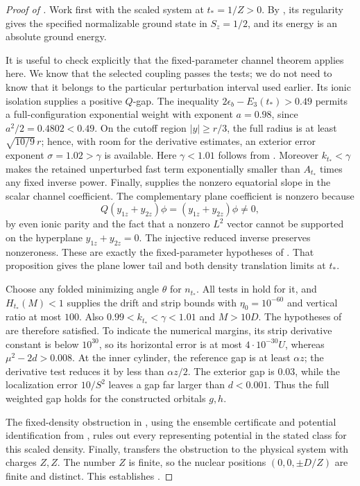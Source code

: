 \begin{proof}[Proof of ]
Work first with the scaled system at \(t_*=1/Z>0\).
By , its regularity gives the
specified normalizable ground state in \(S_z=1/2\), and its
energy is an absolute ground energy.

It is useful to check explicitly that the fixed-parameter channel
theorem applies here.  We know that the selected coupling passes
the tests; we do not need to know that it belongs to the
particular perturbation interval used earlier.  Its ionic
isolation supplies a positive \(Q\)-gap.  The inequality
\(2\epsilon_b-E_3(t_*)>0.49\) permits a full-configuration
exponential weight with exponent \(a=0.98\), since
\(a^2/2=0.4802<0.49\).  On the cutoff region
\(|y|\ge r/3\), the full radius is at least
\(\sqrt{10/9}\,r\); hence, with room for the derivative estimates,
an exterior error exponent \(\sigma=1.02>\gamma\) is available.
Here \(\gamma<1.01\) follows from
.  Moreover \(k_{t_*}<\gamma\)
makes the retained unperturbed fast term exponentially smaller
than \(A_{t_*}\) times any fixed inverse power.
Finally,  supplies the nonzero
equatorial slope in the scalar channel coefficient.  The
complementary plane coefficient is nonzero because
\[
 Q(y_{1z}+y_{2z})\phi=(y_{1z}+y_{2z})\phi\ne0,
\]
by even ionic parity and the fact that a nonzero \(L^2\) vector
cannot be supported on the hyperplane \(y_{1z}+y_{2z}=0\).
The injective reduced inverse preserves nonzeroness.
These are exactly the fixed-parameter hypotheses of
.  That proposition gives the
plane lower tail and both density translation limits at \(t_*\).

Choose any folded minimizing angle \(\theta\) for \(n_{t_*}\).
All tests in  hold for it, and
\(H_{t_*}(M)<1\) supplies the drift and strip bounds with
\(\eta_0=10^{-60}\) and vertical ratio at most \(100\).
Also \(0.99<k_{t_*}<\gamma<1.01\) and \(M>10D\).
The hypotheses of  are therefore
satisfied.  To indicate the numerical margins, its strip
derivative constant is below \(10^{30}\), so its horizontal
error is at most \(4\cdot10^{-30}U\), whereas
\(\mu^2-2d>0.008\).  At the inner cylinder, the reference gap
is at least \(\alpha z\); the derivative test reduces it by
less than \(\alpha z/2\).  The exterior gap is \(0.03\), while
the localization error \(10/S^2\) leaves a gap far larger
than \(d<0.001\).  Thus the full weighted gap holds for the
constructed orbitals \(g,h\).

The fixed-density obstruction in ,
using the ensemble certificate and potential identification
from , rules out every representing
potential in the stated class for this scaled density.
Finally,  transfers the obstruction to the
physical system with charges \(Z,Z\).  The number \(Z\) is finite,
so the nuclear positions \((0,0,\pm D/Z)\) are finite and distinct.
This establishes .
\end{proof}


